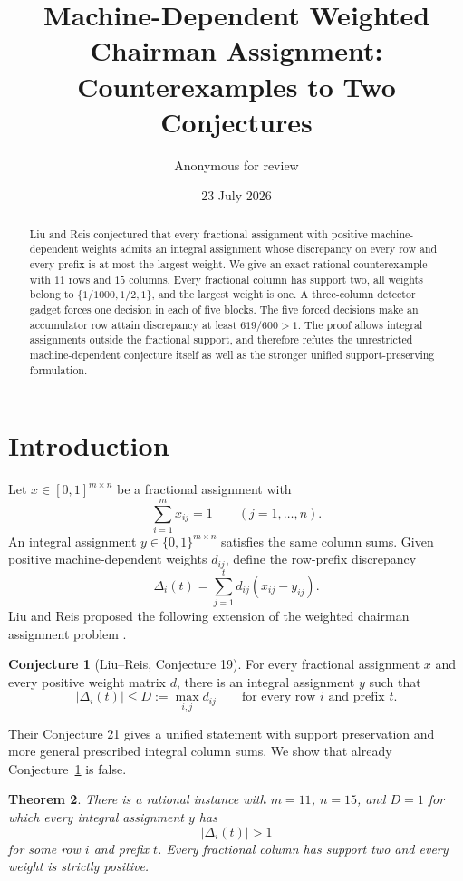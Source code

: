 \documentclass[11pt]{article}
\title{Machine-Dependent Weighted Chairman Assignment:\\
Counterexamples to Two Conjectures}
\author{Anonymous for review}
\date{23 July 2026}
\newtheorem{theorem}{Theorem}
\theoremstyle{definition}
\newtheorem{conjecture}[theorem]{Conjecture}
\newcommand{\disc}{\Delta}
\begin{document}
\maketitle

\begin{abstract}
Liu and Reis conjectured that every fractional assignment with positive
machine-dependent weights admits an integral assignment whose discrepancy on
every row and every prefix is at most the largest weight.  We give an exact
rational counterexample with $11$ rows and $15$ columns.  Every fractional
column has support two, all weights belong to
$\{1/1000,1/2,1\}$, and the largest weight is one.  A three-column detector
gadget forces one decision in each of five blocks.  The five forced decisions
make an accumulator row attain discrepancy at least
$619/600>1$.  The proof allows integral assignments outside the fractional
support, and therefore refutes the unrestricted machine-dependent conjecture
itself as well as the stronger unified support-preserving formulation.
\end{abstract}

\section{Introduction}

Let $x\in[0,1]^{m\times n}$ be a fractional assignment with
\[
 \sum_{i=1}^m x_{ij}=1\qquad(j=1,\ldots,n).
\]
An integral assignment $y\in\{0,1\}^{m\times n}$ satisfies the same column
sums.  Given positive machine-dependent weights $d_{ij}$, define the
row-prefix discrepancy
\[
 \disc_i(t)=\sum_{j=1}^t d_{ij}(x_{ij}-y_{ij}).
\]
Liu and Reis proposed the following extension of the weighted chairman
assignment problem \citep{LiuReis2026}.

\begin{conjecture}[Liu--Reis, Conjecture 19]\label{conj:machine}
For every fractional assignment $x$ and every positive weight matrix $d$,
there is an integral assignment $y$ such that
\[
 |\disc_i(t)|\le D:=\max_{i,j}d_{ij}
 \qquad\text{for every row $i$ and prefix $t$.}
\]
\end{conjecture}

Their Conjecture 21 gives a unified statement with support preservation and
more general prescribed integral column sums.  We show that already
Conjecture~\ref{conj:machine} is false.

\begin{theorem}\label{thm:main}
There is a rational instance with $m=11$, $n=15$, and $D=1$ for which every
integral assignment $y$ has
\[
 |\disc_i(t)|>1
\]
for some row $i$ and prefix $t$.  Every fractional column has support two and
every weight is strictly positive.
\end{theorem}
\end{document}
